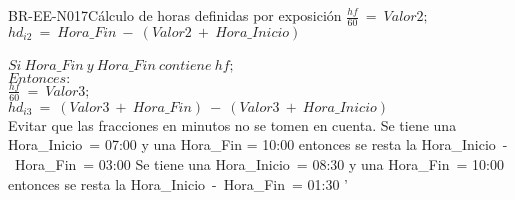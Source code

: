 \begin{BusinessRule}{BR-EE-N017}{Cálculo de horas definidas por exposición}
	$\frac{hf}{60}\ =\ Valor2;$ \\ $hd_{i2}\ =\ Hora\_Fin\ -\ (Valor2\ +\ Hora\_Inicio)$ \\\\
	$Si\ Hora\_Fin\ y\ Hora\_Fin\ contiene\ hf;$\\
	$Entonces:$ \\
	$\frac{hf}{60}\ =\ Valor3;$ \\ $hd_{i3}\ =\ (Valor3\ +\ Hora\_Fin)\ -\ (Valor3\ +\ Hora\_Inicio)$\\ 
	\BRItem[Motivación] Evitar que las fracciones en minutos no se tomen en cuenta.
	 \cdtEmpty
		Se tiene una Hora\_Inicio\ = 07:00 y una Hora\_Fin = 10:00 entonces se resta la Hora\_Inicio\ -\ Hora\_Fin\ = 03:00
		Se tiene una Hora\_Inicio\ = 08:30 y una Hora\_Fin\ = 10:00 entonces se resta la Hora\_Inicio\ -\ Hora\_Fin\ = 01:30
'\end{BusinessRule}


